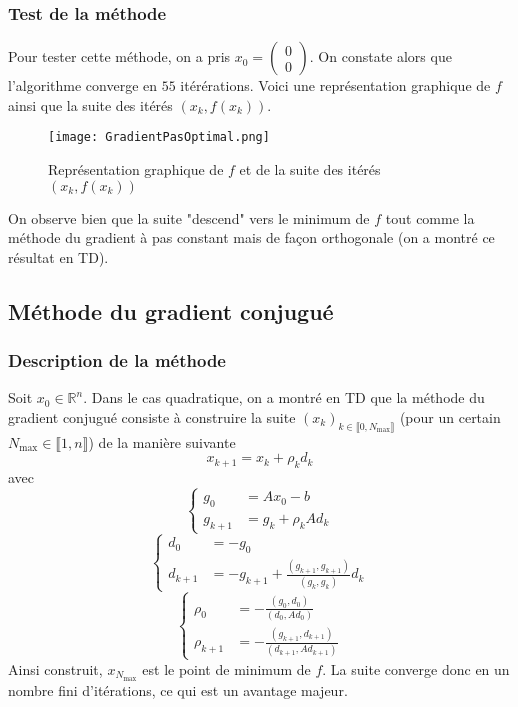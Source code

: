 \documentclass[9pt,a4paper]{article}
\begin{document}
\subsubsection{Test de la méthode}
Pour tester cette méthode, on a pris $x_0 = 
\begin{pmatrix}
    0\\
    0
\end{pmatrix}$.\newline
On constate alors que l'algorithme converge en $55$ itérérations.\newline
Voici une représentation graphique de $f$ ainsi que la suite des itérés $(x_k,f(x_k))$.
\begin{figure}[h]
    \centering
    \texttt{[image: GradientPasOptimal.png]}
    \caption{Représentation graphique de $f$ et de la suite des itérés $(x_k,f(x_k))$}
    \label{fig:enter-label}
\end{figure}\newline
On observe bien que la suite "descend" vers le minimum de $f$ tout comme la méthode du gradient à pas constant mais de façon orthogonale (on a montré ce résultat en TD).
\subsection{Méthode du gradient conjugué}
\subsubsection{Description de la méthode}
Soit $x_0 \in \mathbb{R}^n$. Dans le cas quadratique, on a montré en TD que la méthode du gradient conjugué consiste à construire la suite $(x_k)_{k \in \llbracket 0,N_{\max} \rrbracket}$ (pour un certain $N_{\max} \in \llbracket 1,n \rrbracket $) de la manière suivante
$$
x_{k+1} = x_k + \rho_k d_k
$$
avec
$$
\left\{
\begin{array}{rl}
     g_0 &= A x_0 - b \\
     g_{k+1} &= g_k + \rho_k A d_k
\end{array}
\right.
$$
$$
\left\{
\begin{array}{rl}
    d_0 &= -g_0 \\
    d_{k+1} &= -g_{k+1} + \frac{(g_{k+1},g_{k+1})}{(g_k,g_k)}d_k
\end{array}
\right.
$$
$$
\left\{
\begin{array}{rl}
     \rho_0 &= -\frac{(g_0,d_0)}{(d_0,Ad_0)} \\
     \rho_{k+1} &= -\frac{(g_{k+1},d_{k+1})}{(d_{k+1},Ad_{k+1})}
\end{array}
\right.
$$
Ainsi construit, $x_{N_{\max}}$ est le point de minimum de $f$. La suite converge donc en un nombre fini d'itérations, ce qui est un avantage majeur.
\end{document}
